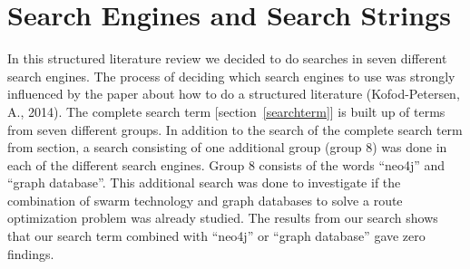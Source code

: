 \chapter{Search Engines and Search Strings}
In this structured literature review we decided to do searches in seven different search engines. The process of deciding which search engines to use was strongly influenced by the paper about how to do a structured literature (Kofod-Petersen, A., 2014)\cite{kofod2014}. The complete search term [section~\ref{searchterm}] is built up of terms from seven different groups. In addition to the search of the complete search term from section, a search consisting of one additional group (group 8) was done in each of the different search engines. Group 8 consists of the words ``neo4j'' and ``graph database''. This additional search was done to investigate if the combination of swarm technology and graph databases to solve a route optimization problem was already studied. The results from our search shows that our search term combined with ``neo4j'' or ``graph database'' gave zero findings. 


